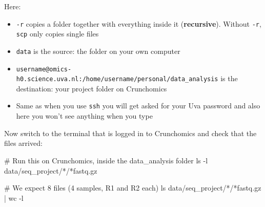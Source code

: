 \documentclass[
  letterpaper,
  DIV=11,
  numbers=noendperiod]{scrreprt}
\newenvironment{Shaded}{}{}
\newcommand{\AttributeTok}[1]{\textcolor[rgb]{0.84,0.23,0.29}{#1}}
\newcommand{\CommentTok}[1]{\textcolor[rgb]{0.42,0.45,0.49}{#1}}
\newcommand{\FunctionTok}[1]{\textcolor[rgb]{0.44,0.26,0.76}{#1}}
\newcommand{\KeywordTok}[1]{\textcolor[rgb]{0.84,0.23,0.29}{#1}}
\newcommand{\NormalTok}[1]{\textcolor[rgb]{0.14,0.16,0.18}{#1}}
\newcommand{\PreprocessorTok}[1]{\textcolor[rgb]{0.84,0.23,0.29}{#1}}
\providecommand{\tightlist}{%
  \setlength{\itemsep}{0pt}\setlength{\parskip}{0pt}}
\begin{document}
Here:

\begin{itemize}
\tightlist
\item
  \texttt{-r} copies a folder together with everything inside it
  (\textbf{recursive}). Without \texttt{-r}, \texttt{scp} only copies
  single files
\item
  \texttt{data} is the source: the folder on your own computer
\item
  \texttt{username@omics-h0.science.uva.nl:/home/username/personal/data\_analysis}
  is the destination: your project folder on Crunchomics
\item
  Same as when you use \texttt{ssh} you will get asked for your Uva
  password and also here you won't see anything when you type
\end{itemize}

Now switch to the terminal that is logged in to Crunchomics and check
that the files arrived:

\begin{Shaded}
\begin{Highlighting}[]
\CommentTok{\# Run this on Crunchomics, inside the data\_analysis folder}
\FunctionTok{ls} \AttributeTok{{-}l}\NormalTok{ data/seq\_project/}\PreprocessorTok{*}\NormalTok{/}\PreprocessorTok{*}\NormalTok{fastq.gz}

\CommentTok{\# We expect 8 files (4 samples, R1 and R2 each)}
\FunctionTok{ls}\NormalTok{ data/seq\_project/}\PreprocessorTok{*}\NormalTok{/}\PreprocessorTok{*}\NormalTok{fastq.gz }\KeywordTok{|} \FunctionTok{wc} \AttributeTok{{-}l}
\end{Highlighting}
\end{Shaded}
\end{document}
